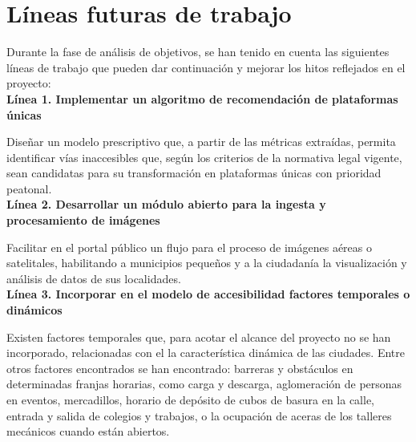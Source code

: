 

\section{Líneas futuras de trabajo}
Durante la fase de análisis de objetivos, se han tenido en cuenta las siguientes líneas de trabajo que pueden dar continuación y mejorar los hitos reflejados en el proyecto:
\\

\textbf{Línea 1. Implementar un algoritmo de recomendación de plataformas únicas}

Diseñar un modelo prescriptivo que, a partir de las métricas extraídas, permita identificar vías inaccesibles que, según los criterios de la normativa legal vigente, sean candidatas para su transformación en plataformas únicas con prioridad peatonal.
\\

\textbf{Línea 2. Desarrollar un módulo abierto para la ingesta y procesamiento de imágenes}

Facilitar en el portal público un flujo para el proceso de imágenes aéreas o satelitales, habilitando a municipios pequeños y a la ciudadanía  la visualización y análisis de datos de sus localidades.
\\

\textbf{Línea 3. Incorporar en el modelo de accesibilidad factores temporales o dinámicos}

Existen factores temporales que, para acotar el alcance del proyecto no se han incorporado, relacionadas con el la característica dinámica de las ciudades. Entre otros factores encontrados se han encontrado: barreras y obstáculos en determinadas franjas horarias, como carga y descarga, aglomeración de personas en eventos, mercadillos, horario de depósito de cubos de basura en la calle, entrada y salida de colegios y trabajos, o la ocupación de aceras de los talleres mecánicos cuando están abiertos.
\\

